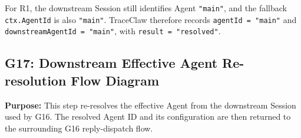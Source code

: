For R1, the downstream Session still identifies Agent
\texttt{"main"}, and the fallback \texttt{ctx.AgentId} is also
\texttt{"main"}. TraceClaw therefore records
\texttt{agentId = "main"} and
\texttt{downstreamAgentId = "main"}, with
\texttt{result = "resolved"}.


\subsection*{G17: Downstream Effective Agent Re-resolution Flow Diagram}

\textbf{Purpose:}
This step re-resolves the effective Agent from the downstream Session
used by G16. The resolved Agent ID and its configuration are then
returned to the surrounding G16 reply-dispatch flow.

